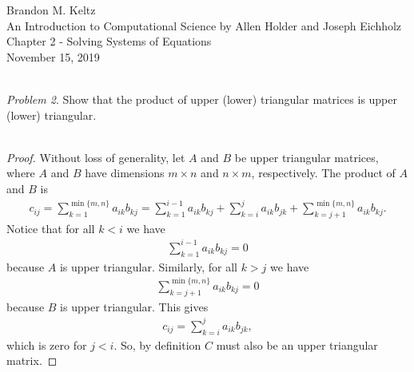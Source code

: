 \documentclass{article}
\begin{document}
	
	\begin{flushleft}	
	
		Brandon M. Keltz\\
		An Introduction to Computational Science by Allen Holder and Joseph Eichholz\\
		Chapter 2 - Solving Systems of Equations\\
		November 15, 2019\\\
		
		\textit{Problem 2}. Show that the product of upper (lower) triangular matrices is upper (lower) triangular. \\\
		
		\begin{proof}
		
			Without loss of generality, let $A$ and $B$ be upper triangular matrices, where $A$ and $B$ have dimensions $m \times n$ and $n \times m$, respectively. The product of $A$ and $B$ is
			\begin{align*}
				c_{ij} = \sum_{k = 1}^{\min \{ m, n \}} a_{ik} b_{kj} = \sum_{k = 1}^{i - 1} a_{ik} b_{kj} + \sum_{k = i}^j a_{ik} b_{jk} + \sum_{k = j + 1}^{\min \{ m, n \}} a_{ik} b_{kj}.
			\end{align*}
			Notice that for all $k < i$ we have
			\begin{align*}
				\sum_{k = 1}^{i - 1} a_{ik} b_{kj} = 0
			\end{align*}
			because $A$ is upper triangular. Similarly, for all $k > j$ we have
			\begin{align*}
				\sum_{k = j + 1}^{\min \{ m, n \}} a_{ik} b_{kj} = 0
			\end{align*}
			because $B$ is upper triangular. This gives 
			\begin{align*}
				c_{ij} = \sum_{k = i}^j a_{ik} b_{jk},
			\end{align*}
			which is zero for $j < i$. So, by definition $C$ must also be an upper triangular matrix.			
		
		\end{proof}
	
	\end{flushleft}
	
\end{document}
